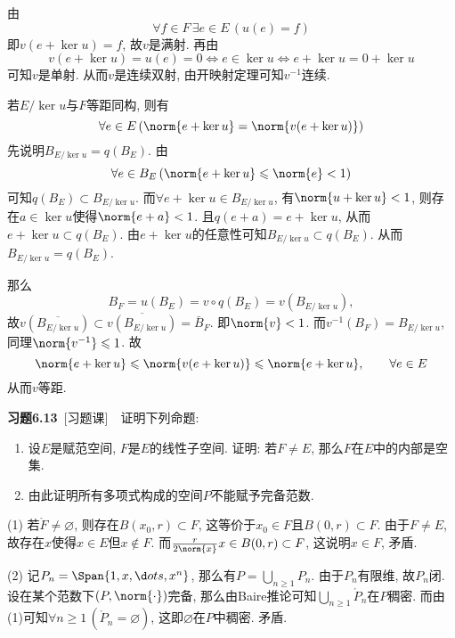 \begin{answer}
	由
	\[
	\forall f\in F\,\exists e\in E\,(u(e)=f)
	\]
	即$ v(e+\ker u)=f $, 故$ v $是满射. 再由
	\[
	v(e+\ker u)=u(e)=0\Longleftrightarrow e\in\ker u\Longleftrightarrow e+\ker u=0+\ker u
	\]
	可知$ v $是单射. 从而$ v $是连续双射, 由开映射定理可知$ v^{-1} $连续.
	
	若$ E/\ker u $与$ F $等距同构, 则有
	\[
	\forall e\in E\,(\norm{e+\ker u}=\norm{v(e+\ker u)})
	\]
	先说明$ B_{E/\ker u}=q(B_E) $. 由
	\[
	\forall e\in B_E\,(\norm{e+\ker u}\leqslant\norm{e}<1)
	\]
	可知$ q(B_E)\subset B_{E/\ker u} $. 而$ \forall e+\ker u\in B_{E/\ker u} $, 有$ \norm{u+\ker u}<1 $, 则存在$ a\in\ker u $使得$ \norm{e+a}<1 $. 且$ q(e+a)=e+\ker u $, 从而$ e+\ker u\subset q(B_E) $. 由$ e+\ker u $的任意性可知$ B_{E/\ker u}\subset q(B_E) $. 从而$ B_{E/\ker u}=q(B_E) $.
	
	那么
	\[
	B_F=u(B_E)=v\circ q(B_E)=v(B_{E/\ker u}),
	\]
	故$ v(\overline{B_{E/\ker u}})\subset\overline{v(B_{E/\ker u})}=\bar{B}_F $. 即$ \norm{v}<1 $. 而$ v^{-1}(B_F)=B_{E/\ker u} $, 同理$ \norm{v^{-1}}\leqslant 1 $. 故
	\[
	\norm{e+\ker u}\leqslant\norm{v(e+\ker u)}\leqslant\norm{e+\ker u},\qquad \forall e\in E
	\]
	从而$ v $等距.\qedhere
	\end{answer}
	
	\textbf{习题6.13}\ [习题课]\ \ 证明下列命题:
	\begin{enumerate}
	\item 设$ E $是赋范空间, $ F $是$ E $的线性子空间. 证明: 若$ F\ne E $, 那么$ F $在$ E $中的内部是空集.
	\item 由此证明所有多项式构成的空间$ P $不能赋予完备范数.
	\end{enumerate}
	\begin{answer}
	(1) 若$ \mathring{F}\ne\varnothing $, 则存在$ B(x_0,r)\subset F $, 这等价于$ x_0\in F $且$ B(0,r)\subset F $. 由于$ F\ne E $, 故存在$ x $使得$ x\in E $但$ x\notin F $. 而$ \frac{r}{2\norm{x}}x\in B(0,r)\subset F $, 这说明$ x\in F $, 矛盾.
	
	(2) 记$ P_n=\Span\{ 1,x,\d ots,x^n \} $, 那么有$ P=\bigcup_{n\geqslant 1}P_n $. 由于$ P_n $有限维, 故$ P_n $闭. 设在某个范数下$ (P,\norm{\cdot}) $完备, 那么由Baire推论可知$ \bigcup_{n\geqslant 1}\mathring{P}_n $在$ P $稠密. 而由(1)可知$ \forall n\geqslant 1\,(\mathring{P}_n=\varnothing) $, 这即$ \varnothing $在$ P $中稠密. 矛盾.\qedhere
	\end{answer}
	
